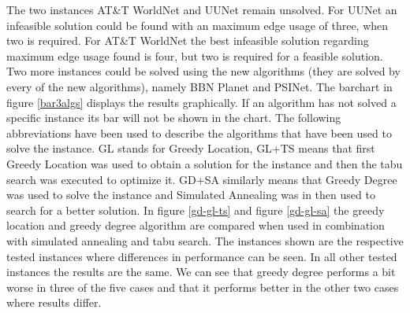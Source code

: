 \documentclass [12pt]{article}
\begin{document}
  The two instances AT\&T WorldNet and UUNet remain unsolved. For UUNet an infeasible solution could be found with an maximum edge usage of three, when two is required. 
  For AT\&T WorldNet the best infeasible solution regarding maximum edge usage found is four, but two is required for a feasible solution. 
  Two more instances could be solved using the new algorithms (they are solved by every of the new algorithms), namely BBN Planet and PSINet.
  The barchart in figure \ref{bar3algs} displays the results graphically. If an algorithm has not solved a specific instance its bar will not be shown in the chart.
  The following abbreviations have been used to describe the algorithms that have been used to solve the instance. GL stands for Greedy Location, GL+TS means that first Greedy Location was used 
  to obtain a solution for the instance and then the tabu search was executed to optimize it. GD+SA similarly means that Greedy Degree was used to solve the instance and Simulated Annealing was in then used
  to search for a better solution. In figure \ref{gd-gl-ts} and figure \ref{gd-gl-sa} the greedy location and greedy degree algorithm are compared when used in combination with simulated
  annealing and tabu search. The instances shown are the respective tested instances where differences in performance can be seen. In all other tested instances the results are the same. 
  We can see that greedy degree performs a bit worse in three of the five cases and that it performs better in the other two cases where results differ.
\end{document}
